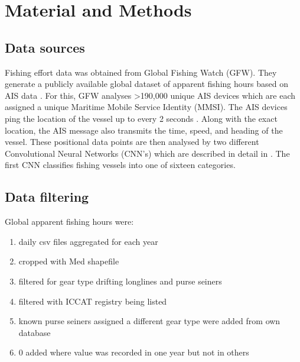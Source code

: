 \chapter{Material and Methods}
\section{Data sources}
Fishing effort data was obtained from Global Fishing Watch (GFW). They generate
a publicly available global dataset of apparent fishing hours based on AIS data \citep{gfw_dataset}. 
For this, GFW analyses >190,000 unique AIS devices which are each assigned a unique Maritime Mobile Service Identity (MMSI).
The AIS devices ping the location of the vessel up to every 2 seconds \citep{kontasvesselupdate, taconet2019global}. Along with the exact location,
the AIS message also transmits the time, speed, and heading of the vessel. These positional data points are then analysed by two 
different Convolutional Neural Networks (CNN's) which are described in detail in \cite{Kroodsma18}. 
The first CNN classifies fishing vessels into one of sixteen categories.


\section{Data filtering}
Global apparent fishing hours were:\begin{enumerate}
    \item daily csv files aggregated for each year
    \item cropped with Med shapefile
    \item filtered for gear type drifting longlines and purse seiners
    \item filtered with ICCAT registry being listed
    \item known purse seiners assigned a different gear type were added from own database
    \item 0 added where value was recorded in one year but not in others
\end{enumerate}